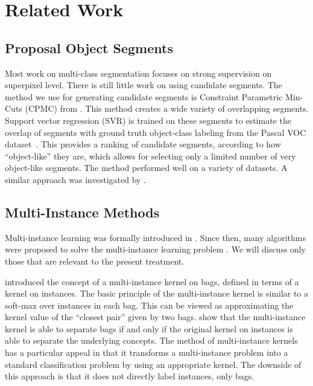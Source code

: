 \section{Related Work}
\subsection{Proposal Object Segments}\label{related_segments}
Most work on multi-class segmentation focuses on strong supervision on
superpixel level. There is still little work on using candidate segments.  The
method we use for generating candidate segments is Constraint Parametric
Min-Cuts (CPMC) from \citet{carreira2010constrained}.  This method creates a
wide variety of overlapping segments. Support vector regression (SVR) is
trained on these segments to estimate the overlap of segments with ground truth
object-class labeling from the Pascal VOC dataset~\citep{pascal}. This provides
a ranking of candidate segments, according to how ``object-like'' they are,
which allows for selecting only a limited number of very object-like segments.
The method performed well on a variety of datasets. A similar approach was
investigated by \citet{endres2010category}.

\subsection{Multi-Instance Methods}
Multi-instance learning was formally introduced in \citet{dietterich1997solving}.
Since then, many algorithms were proposed to solve the multi-instance learning problem
\citep{andrews2003support,gaertner2002multi,zhou2009multi,li2009convex,zhang2002dd,mangasarian2008multiple,leistner2010miforests,chen2006miles}.
We will discuss only those that are relevant to the present treatment.

\citet{gaertner2002multi} introduced the concept of a multi-instance
kernel on bags, defined in terms of a kernel on instances. 
The basic principle of the multi-instance kernel is similar to a soft-max over instances in
each bag. This can be viewed as approximating the kernel value of the ``closest pair'' given by two bags. \citet{gaertner2002multi} show that the multi-instance kernel
is able to separate bags if and only if the original kernel on instances is able to separate the underlying concepts.
The method of multi-instance kernels has a particular appeal in that it transforms a multi-instance problem into a standard
classification problem by using an appropriate kernel. The downside of this approach is that it does
not directly label instances, only bags.

